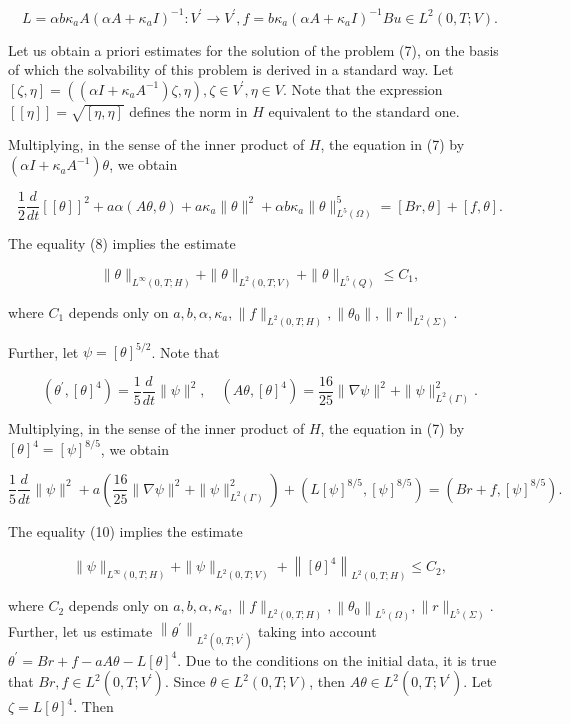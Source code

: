 $$
L=\alpha b \kappa_{a} A\left(\alpha A+\kappa_{a} I\right)^{-1}: V^{\prime} \rightarrow V^{\prime}, f=b \kappa_{a}\left(\alpha A+\kappa_{a} I\right)^{-1} B u \in L^{2}(0, T ; V) .
$$

Let us obtain a priori estimates for the solution of the problem (7), on the basis of which the solvability of this problem is derived in a standard way. Let $[\zeta, \eta]=\left(\left(\alpha I+\kappa_{a} A^{-1}\right) \zeta, \eta\right), \zeta \in V^{\prime}, \eta \in V$. Note that the expression $[[\eta]]=\sqrt{[\eta, \eta]}$ defines the norm in $H$ equivalent to the standard one.

Multiplying, in the sense of the inner product of $H$, the equation in (7) by $\left(\alpha I+\kappa_{a} A^{-1}\right) \theta$, we obtain

$$
\frac{1}{2} \frac{d}{d t}[[\theta]]^{2}+a \alpha(A \theta, \theta)+a \kappa_{a}\|\theta\|^{2}+\alpha b \kappa_{a}\|\theta\|_{L^{5}(\Omega)}^{5}=[B r, \theta]+[f, \theta] .
$$

The equality (8) implies the estimate

$$
\|\theta\|_{L^{\infty}(0, T ; H)}+\|\theta\|_{L^{2}(0, T ; V)}+\|\theta\|_{L^{5}(Q)} \leq C_{1},
$$

where $C_{1}$ depends only on $a, b, \alpha, \kappa_{a},\|f\|_{L^{2}(0, T ; H)},\left\|\theta_{0}\right\|,\|r\|_{L^{2}(\Sigma)}$.

Further, let $\psi=[\theta]^{5 / 2}$. Note that

$$
\left(\theta^{\prime},[\theta]^{4}\right)=\frac{1}{5} \frac{d}{d t}\|\psi\|^{2}, \quad\left(A \theta,[\theta]^{4}\right)=\frac{16}{25}\|\nabla \psi\|^{2}+\|\psi\|_{L^{2}(\Gamma)}^{2} .
$$

Multiplying, in the sense of the inner product of $H$, the equation in (7) by $[\theta]^{4}=[\psi]^{8 / 5}$, we obtain

$$
\frac{1}{5} \frac{d}{d t}\|\psi\|^{2}+a\left(\frac{16}{25}\|\nabla \psi\|^{2}+\|\psi\|_{L^{2}(\Gamma)}^{2}\right)+\left(L[\psi]^{8 / 5},[\psi]^{8 / 5}\right)=\left(B r+f,[\psi]^{8 / 5}\right) .
$$

The equality (10) implies the estimate

$$
\|\psi\|_{L^{\infty}(0, T ; H)}+\|\psi\|_{L^{2}(0, T ; V)}+\left\|[\theta]^{4}\right\|_{L^{2}(0, T ; H)} \leq C_{2},
$$

where $C_{2}$ depends only on $a, b, \alpha, \kappa_{a},\|f\|_{L^{2}(0, T ; H)},\left\|\theta_{0}\right\|_{L^{5}(\Omega)},\|r\|_{L^{5}(\Sigma)}$. Further, let us estimate $\left\|\theta^{\prime}\right\|_{L^{2}\left(0, T ; V^{\prime}\right)}$ taking into account $\theta^{\prime}=B r+f-a A \theta-L[\theta]^{4}$. Due to the conditions on the initial data, it is true that $B r, f \in L^{2}\left(0, T ; V^{\prime}\right)$. Since $\theta \in L^{2}(0, T ; V)$, then $A \theta \in L^{2}\left(0, T ; V^{\prime}\right)$. Let $\zeta=L[\theta]^{4}$. Then

